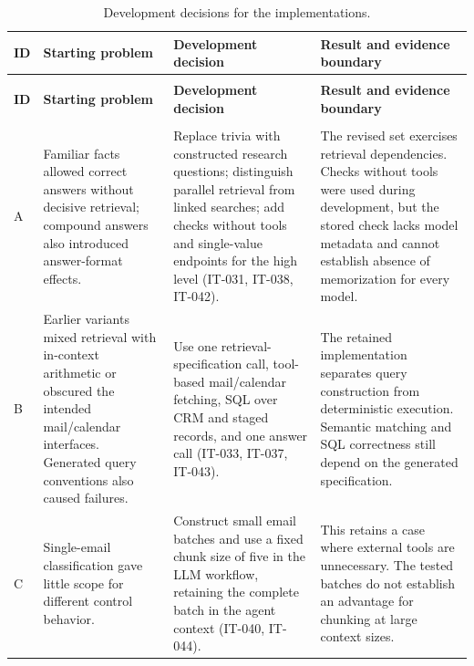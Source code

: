 \begingroup
\renewcommand{\baselinestretch}{1}
\small
\setlength{\tabcolsep}{4pt}
\renewcommand{\arraystretch}{1.08}
\begin{longtable}{>{\raggedright\arraybackslash}p{} >{\raggedright\arraybackslash}p{} >{\raggedright\arraybackslash}p{} >{\raggedright\arraybackslash}p{}}
\caption[Development decisions for the implementations]{Development decisions for the implementations.}\label{tab:app-implementation-development} \\
\toprule
\textbf{ID} & \textbf{Starting problem} & \textbf{Development decision} & \textbf{Result and evidence boundary} \\
\midrule
\endfirsthead
\multicolumn{4}{l}{\tablename~\thetable{} (continued)} \\
\toprule
\textbf{ID} & \textbf{Starting problem} & \textbf{Development decision} & \textbf{Result and evidence boundary} \\
\midrule
\endhead
\midrule
\multicolumn{4}{r}{\emph{Continued on the next page.}} \\
\endfoot
\bottomrule
\endlastfoot
A & Familiar facts allowed correct answers without decisive retrieval; compound answers also introduced answer-format effects. & Replace trivia with constructed research questions; distinguish parallel retrieval from linked searches; add checks without tools and single-value endpoints for the high level (IT-031, IT-038, IT-042). & The revised set exercises retrieval dependencies. Checks without tools were used during development, but the stored check lacks model metadata and cannot establish absence of memorization for every model. \\
\addlinespace[2.5pt]
B & Earlier variants mixed retrieval with in-context arithmetic or obscured the intended mail/calendar interfaces. Generated query conventions also caused failures. & Use one retrieval-specification call, tool-based mail/calendar fetching, SQL over CRM and staged records, and one answer call (IT-033, IT-037, IT-043). & The retained implementation separates query construction from deterministic execution. Semantic matching and SQL correctness still depend on the generated specification. \\
\addlinespace[2.5pt]
C & Single-email classification gave little scope for different control behavior. & Construct small email batches and use a fixed chunk size of five in the LLM workflow, retaining the complete batch in the agent context (IT-040, IT-044). & This retains a case where external tools are unnecessary. The tested batches do not establish an advantage for chunking at large context sizes. \\

\end{longtable}
